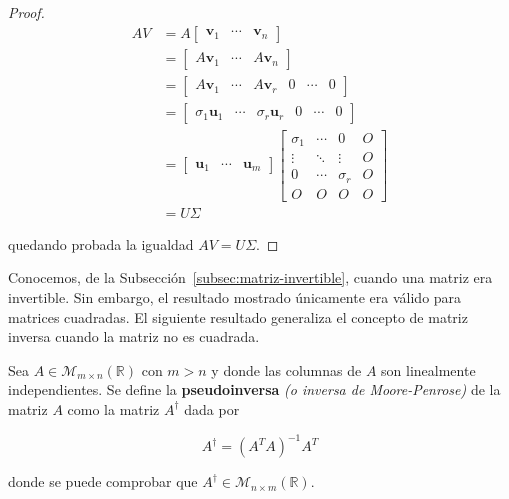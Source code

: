 \begin{proof}
    \begin{align*}
        A V &= A \begin{bmatrix} \mathbf{v}_1 & \cdots & \mathbf{v}_n \end{bmatrix} \\
            &= \begin{bmatrix} A \mathbf{v}_1 & \cdots & A \mathbf{v}_n \end{bmatrix} \\
            &= \begin{bmatrix} A \mathbf{v}_1 & \cdots & A \mathbf{v}_r & 0 & \cdots & 0 \end{bmatrix} \\
            &= \begin{bmatrix} \sigma_1 \mathbf{u}_1 & \cdots & \sigma_r \mathbf{u}_r & 0 & \cdots & 0 \end{bmatrix} \\
            &= \begin{bmatrix} \mathbf{u}_1 & \cdots & \mathbf{u}_m \end{bmatrix}
               \begin{bmatrix} 
                   \sigma_1 & \cdots & 0 & O \\
                   \vdots & \ddots & \vdots & O \\
                   0 & \cdots & \sigma_r & O \\
                   O & O & O & O
               \end{bmatrix} \\
            &= U \Sigma
    \end{align*}

    quedando probada la igualdad $AV = U \Sigma$.\newline
\end{proof}

Conocemos, de la Subsección~\ref{subsec:matriz-invertible}, cuando una matriz era invertible. Sin embargo, el resultado mostrado únicamente era válido para matrices cuadradas. El siguiente resultado generaliza el concepto de matriz inversa cuando la matriz no es cuadrada.
\begin{definicion}[Pseudoinversa]
    Sea $A \in \mathcal{M}_{m \times n}(\mathbb{R})$ con $m > n$ y donde las columnas de $A$ son linealmente independientes. Se define la \textbf{pseudoinversa} \emph{(o inversa de Moore-Penrose)} de la matriz $A$ como la matriz $A^{\dagger}$ dada por

    \[ A^{\dagger} = {(A^{T}A)}^{-1}A^{T} \]

    donde se puede comprobar que $A^{\dagger} \in \mathcal{M}_{n \times m}(\mathbb{R})$.\newline
\end{definicion}

